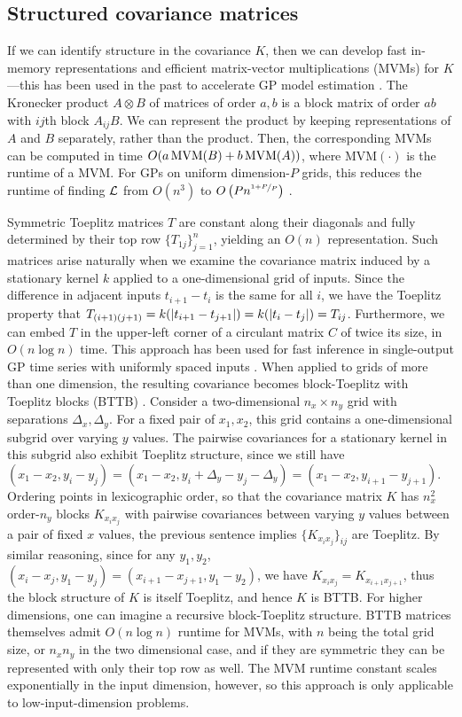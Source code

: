 \documentclass[twoside]{article}
\begin{document}
\subsection{Structured covariance matrices}

If we can identify structure in the covariance $K$, then we can develop fast in-memory representations and efficient matrix-vector multiplications (MVMs) for $K$---this has been used in the past to accelerate GP model estimation \citep{gilboa2015scaling, cunningham2008fast}. The Kronecker product $A\otimes B$ of matrices of order $a,b$ is a block matrix of order $ab$ with $ij$th block $A_{ij}B$. We can represent the product by keeping representations of $A$ and $B$ separately, rather than the product. Then, the corresponding MVMs can be computed in time $O(a\operatorname{MVM}(B)+b\operatorname{MVM}(A))$, where $\text{MVM}(\cdot)$ is the runtime of a MVM. For GPs on uniform dimension-$P$ grids, this reduces the runtime of finding $\mathcal{L}$ from $O(n^3)$ to $O\left({Pn^{\nicefrac{1+P}{P}}}\right)$ \citep{gilboa2015scaling}.

Symmetric Toeplitz matrices $T$ are constant along their diagonals and fully determined by their top row $\{T_{1j}\}_{j=1}^n$, yielding an $O(n)$ representation. Such matrices arise naturally when we examine the covariance matrix induced by a stationary kernel $k$ applied to a one-dimensional grid of inputs. Since the difference in adjacent inputs $t_{i+1}-t_{i}$ is the same for all $i$, we have the Toeplitz property that $T_{(i+1)(j+1)}=k(\left|t_{i+1} -t_{j+1}\right|)=k(\left|t_i-t_j\right|)=T_{ij}$. Furthermore, we can embed $T$ in the upper-left corner of a circulant matrix $C$ of twice its size, in $O(n\log n)$ time. This approach has been used for fast inference in single-output GP time series with uniformly spaced inputs \citep{cunningham2008fast}. When applied to grids of more than one dimension, the resulting covariance becomes block-Toeplitz with Toeplitz blocks (BTTB) \citep{msgp}. Consider a two-dimensional $n_x\times n_y$ grid with separations $\Delta_x,\Delta_y$. For a fixed pair of $x_1,x_2$, this grid contains a one-dimensional subgrid over varying $y$ values. The pairwise covariances for a stationary kernel in this subgrid also exhibit Toeplitz structure, since we still have $(x_1-x_2,y_i-y_j)=(x_1-x_2,y_i+\Delta_y-y_{j}-\Delta_y)=(x_1-x_2,y_{i+1}-y_{j+1})$. Ordering points in lexicographic order, so that the covariance matrix $K$ has $n_x^2$ order-$n_y$ blocks $K_{x_ix_j}$ with pairwise covariances between varying $y$ values between a pair of fixed $x$ values, the previous sentence implies $\{K_{x_ix_j}\}_{ij}$ are Toeplitz. By similar reasoning, since for any $y_1,y_2$, $(x_i-x_j,y_1-y_j)=(x_{i+1}-x_{j+1},y_1-y_2)$, we have $K_{x_ix_j}=K_{x_{i+1}x_{j+1}}$, thus the block structure of $K$ is itself Toeplitz, and hence $K$ is BTTB. For higher dimensions, one can imagine a recursive block-Toeplitz structure. BTTB matrices themselves admit $O(n\log n)$ runtime for MVMs, with $n$ being the total grid size, or $n_xn_y$ in the two dimensional case, and if they are symmetric they can be represented with only their top row as well. The MVM runtime constant scales exponentially in the input dimension, however, so this approach is only applicable to low-input-dimension problems.
\end{document}
